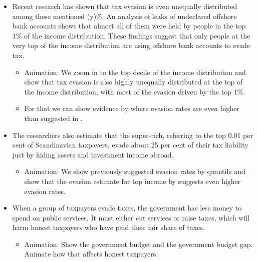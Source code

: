 \documentclass[11pt]{article}
\begin{document}
\begin{itemize}
    \begin{itemize}
        \item Animation: We show how tax evasion is distributed along the income distribution and show how much each percentile contributes to the "tax evasion pie". 
        \item Here we could use examples of \cite{johns2010distribution}, which show evasion rates along the income distribution for deciles and quantiles.
    \end{itemize}  
    \item Recent research has shown that tax evasion is even unequally distributed among these mentioned (y)\%. An analysis of leaks of undeclared offshore bank accounts shows that almost all of them were held by people in the top 1\% of the income distribution. These findings suggest that only people at the very top of the income distribution are using offshore bank accounts to evade tax.
    \begin{itemize}
        \item Animation: We zoom in to the top decile of the income distribution and show that tax evasion is also highly unequally distributed at the top of the income distribution, with most of the evasion driven by the top 1\%.
        \item For that we can show evidence by \cite{alstadsaeter2019tax} where evasion rates are even higher than suggested in \cite{johns2010distribution}. 
    \end{itemize} 
\item The researchers also estimate that the super-rich, referring to the top 0.01 per cent of Scandinavian taxpayers, evade about 25 per cent of their tax liability just by hiding assets and investment income abroad. 
\begin{itemize}
    \item Animation: We show previously suggested evasion rates by quantile and show that the evasion estimate for top income by \cite{alstadsaeter2019tax} suggests even higher evasion rates. 
\end{itemize}
\item When a group of taxpayers evade taxes, the government has less money to spend on public services. It must either cut services or raise taxes, which will harm honest taxpayers who have paid their fair share of taxes. 
\begin{itemize}
    \item Animation: Show the government budget and the government budget gap. Animate how that affects honest taxpayers.

\end{itemize}
\end{itemize}
\end{document}
